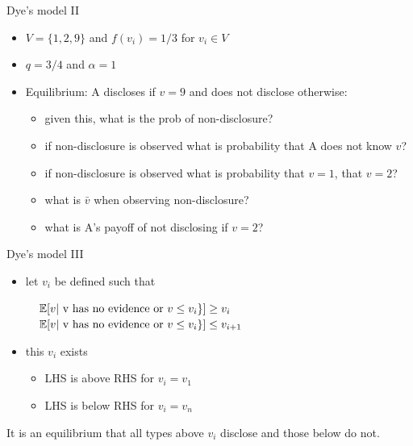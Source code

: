 \documentclass[bigger]{beamer}
\begin{document}
\begin{frame}[label={sec:orgheadline10}]{Dye's model II}
\begin{example}
\begin{itemize}
\item \(V=\{1,2,9\}\) and \(f(v_i)=1/3\) for \(v_i\in V\)
\item \(q=3/4\) and \(\alpha=1\)
\item Equilibrium: A discloses if \(v=9\) and does not disclose otherwise:
\begin{itemize}
\item given this, what is the prob of non-disclosure?

\item if non-disclosure is observed what is probability that A does not know \(v\)?

\item if non-disclosure is observed what is probability that \(v=1\), that \(v=2\)?

\item what is \(\bar{v}\) when observing non-disclosure?

\item what is A's payoff of not disclosing if \(v=2\)?
\end{itemize}
\end{itemize}
\end{example}
\end{frame}

\begin{frame}[label={sec:orgheadline11}]{Dye's model III}
\begin{itemize}
\item let \(v_i\) be defined such that
\end{itemize}

\(\hspace*{1cm}\mathbb{E}[v|\mbox{ v has no evidence or }v\leq v_i\}] \geq v_i\)
\(\hspace*{1cm}\mathbb{E}[v|\mbox{ v has no evidence or }v\leq v_i\}] \leq v_{i+1}\)

\begin{itemize}
\item this \(v_i\) exists
\begin{itemize}
\item LHS is above RHS for \(v_i = v_1\)
\item LHS is below RHS for \(v_i = v_n\)
\end{itemize}
\end{itemize}

\begin{theorem}
It is an equilibrium that all types above \(v_i\) disclose and those below do not.
\end{theorem}
\end{frame}
\end{document}
